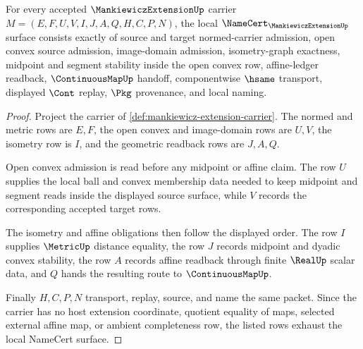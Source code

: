 \begin{theorem}
\label{thm:mankiewicz-extension-namecert-obligations}
For every accepted $\MankiewiczExtensionUp$ carrier $M=(E,F,U,V,I,J,A,Q,H,C,P,N)$, the local $\NameCert_{\MankiewiczExtensionUp}$ surface consists exactly of source and target normed-carrier admission, open convex source admission, image-domain admission, isometry-graph exactness, midpoint and segment stability inside the open convex row, affine-ledger readback, $\ContinuousMapUp$ handoff, componentwise $\hsame$ transport, displayed $\Cont$ replay, $\Pkg$ provenance, and local naming.
\end{theorem}
\begin{proof}
Project the carrier of \autoref{def:mankiewicz-extension-carrier}. The normed and metric rows are $E,F$, the open convex and image-domain rows are $U,V$, the isometry row is $I$, and the geometric readback rows are $J,A,Q$.

Open convex admission is read before any midpoint or affine claim. The row $U$ supplies the local ball and convex membership data needed to keep midpoint and segment reads inside the displayed source surface, while $V$ records the corresponding accepted target rows.

The isometry and affine obligations then follow the displayed order. The row $I$ supplies $\MetricUp$ distance equality, the row $J$ records midpoint and dyadic convex stability, the row $A$ records affine readback through finite $\RealUp$ scalar data, and $Q$ hands the resulting route to $\ContinuousMapUp$.

Finally $H,C,P,N$ transport, replay, source, and name the same packet. Since the carrier has no host extension coordinate, quotient equality of maps, selected external affine map, or ambient completeness row, the listed rows exhaust the local NameCert surface.
\end{proof}

